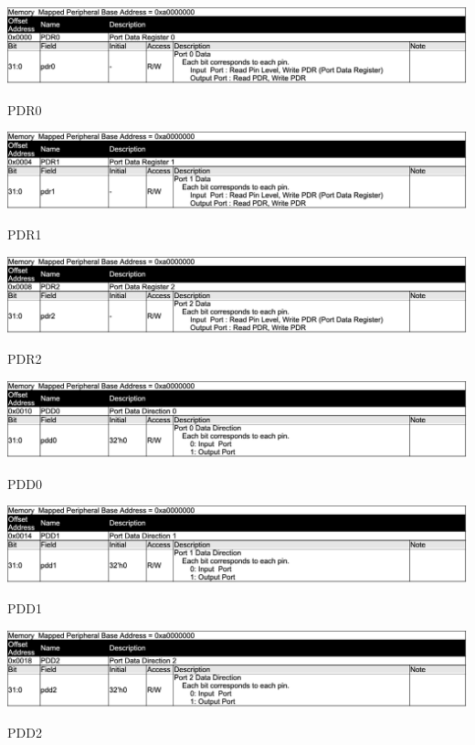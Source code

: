\begin{table}[H]
    \includegraphics[width=1.0\columnwidth]{./Table/REG_GPIO_PDR0.png}
    \caption{PDR0}
    \label{tb:REG_GPIO_PDR0}
\end{table}
\begin{table}[H]
    \includegraphics[width=1.0\columnwidth]{./Table/REG_GPIO_PDR1.png}
    \caption{PDR1}
    \label{tb:REG_GPIO_PDR1}
\end{table}
\begin{table}[H]
    \includegraphics[width=1.0\columnwidth]{./Table/REG_GPIO_PDR2.png}
    \caption{PDR2}
    \label{tb:REG_GPIO_PDR2}
\end{table}
\begin{table}[H]
    \includegraphics[width=1.0\columnwidth]{./Table/REG_GPIO_PDD0.png}
    \caption{PDD0}
    \label{tb:REG_GPIO_PDD0}
\end{table}
\begin{table}[H]
    \includegraphics[width=1.0\columnwidth]{./Table/REG_GPIO_PDD1.png}
    \caption{PDD1}
    \label{tb:REG_GPIO_PDD1}
\end{table}
\begin{table}[H]
    \includegraphics[width=1.0\columnwidth]{./Table/REG_GPIO_PDD2.png}
    \caption{PDD2}
    \label{tb:REG_GPIO_PDD2}
\end{table}

